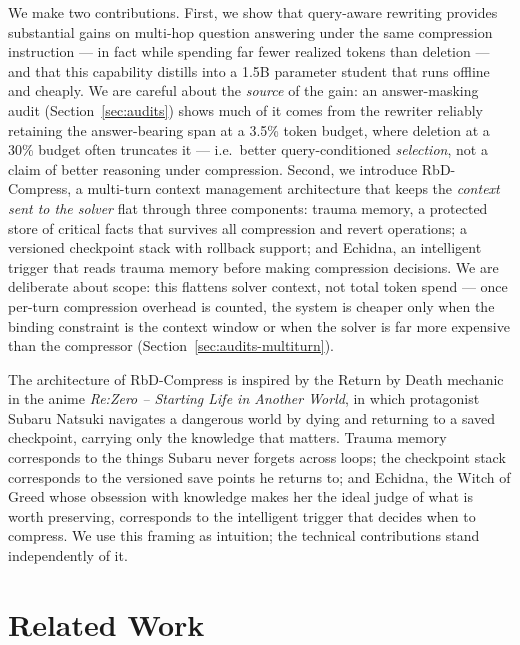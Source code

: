 \documentclass{article}
\begin{document}
We make two contributions. First, we show that query-aware rewriting
provides substantial gains on multi-hop question answering under the same
compression instruction --- in fact while spending far fewer realized tokens
than deletion --- and that this capability distills into a 1.5B parameter
student that runs offline and cheaply. We are careful about the \emph{source}
of the gain: an answer-masking audit (Section~\ref{sec:audits}) shows much of
it comes from the rewriter reliably retaining the answer-bearing span at a
3.5\% token budget, where deletion at a 30\% budget often truncates it ---
i.e.\ better query-conditioned \emph{selection}, not a claim of better
reasoning under compression. Second, we introduce RbD-Compress,
a multi-turn context management architecture that keeps the \emph{context sent
to the solver} flat through three components: trauma memory, a protected store
of critical facts that survives all compression and revert operations; a
versioned checkpoint stack with rollback support; and Echidna, an
intelligent trigger that reads trauma memory before making compression
decisions. We are deliberate about scope: this flattens solver context, not
total token spend --- once per-turn compression overhead is counted, the
system is cheaper only when the binding constraint is the context window or
when the solver is far more expensive than the compressor
(Section~\ref{sec:audits-multiturn}).

The architecture of RbD-Compress is inspired by the Return by Death
mechanic in the anime \textit{Re:Zero -- Starting Life in Another World},
in which protagonist Subaru Natsuki navigates a dangerous world by dying
and returning to a saved checkpoint, carrying only the knowledge that
matters. Trauma memory corresponds to the things Subaru never forgets
across loops; the checkpoint stack corresponds to the versioned save
points he returns to; and Echidna, the Witch of Greed whose obsession
with knowledge makes her the ideal judge of what is worth preserving,
corresponds to the intelligent trigger that decides when to compress.
We use this framing as intuition; the technical contributions stand
independently of it.



\section{Related Work}
\end{document}
